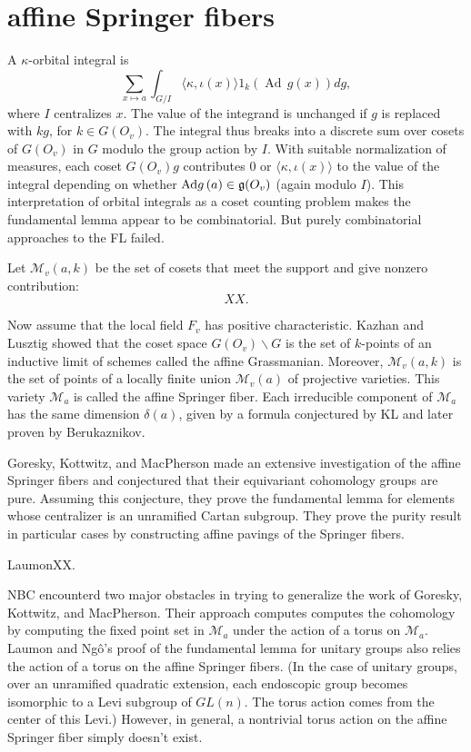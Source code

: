 \documentclass[brochure,english,12pt]{bourbaki}
\def\op#1{{\operatorname{#1}}}
\def\b{\backslash }
\def\g{\frak{g}}
\def\M{{\mathcal M}}
\begin{document}
\section{affine Springer fibers}



A $\kappa$-orbital integral is
\[
\sum_ {x\mapsto a} \int_{G/I} \langle\kappa,\iota(x)\rangle 1_k (\op{Ad}\, g(x)) dg,
\]
where $I$ centralizes $x$.  The value of the integrand is unchanged if
$g$ is replaced with $k g$, for $k\in G(O_v)$.  The integral thus
breaks into a discrete sum over cosets of $G(O_v)$ in $G$ modulo the
group action by $I$.  With suitable normalization of measures, each
coset $G(O_v)g$ contributes $0$ or $\langle\kappa,\iota(x)\rangle$ to
the value of the integral depending on whether $\op{Ad}g\,(a) \in
\g(O_v)$ (again modulo $I$).  This interpretation of orbital integrals
as a coset counting problem makes the fundamental lemma appear to be
combinatorial.  But purely combinatorial approaches to the FL failed.

Let $\M_v(a,k)$ be the set of cosets that meet the support and give nonzero contribution:
\[
XX.
\]


Now assume that the local field $F_v$ has positive characteristic.
Kazhan and Lusztig showed that the coset space $G(O_v)\b G$ is the set of
$k$-points of an inductive limit of schemes called the affine Grassmanian.   
Moreover, $\M_v(a,k)$ is the set of points of a locally finite union
$\M_v(a)$ of projective varieties.  This variety $\M_a$ is called the affine Springer
fiber.  Each irreducible component of $\M_a$ has the same dimension
$\delta(a)$, given by a formula conjectured by KL and later proven by Berukaznikov.

Goresky, Kottwitz, and MacPherson made an extensive investigation of
the affine Springer fibers and conjectured that their equivariant
cohomology groups are pure.  Assuming this conjecture, they prove the
fundamental lemma for elements whose centralizer is an unramified
Cartan subgroup.  They prove the purity result in particular cases by
constructing affine pavings of the Springer fibers.

LaumonXX.

NBC encounterd two major obstacles in trying to generalize the work of
Goresky, Kottwitz, and MacPherson.  Their approach computes computes
the cohomology by computing the fixed point set in $\M_a$ under the
action of a torus on $\M_a$.  Laumon and Ng\^o's proof of the
fundamental lemma for unitary groups also relies the action of a torus
on the affine Springer fibers.  (In the case of unitary groups, over
an unramified quadratic extension, each endoscopic group becomes
isomorphic to a Levi subgroup of $GL(n)$.  The torus action comes from
the center of this Levi.)  However, in general, a nontrivial torus
action on the affine Springer fiber simply doesn't exist.
\end{document}
